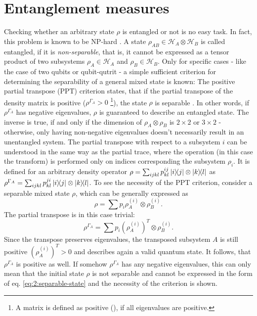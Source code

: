 \section{Entanglement measures}\label{sec:2:entanglement-measures}
Checking whether an arbitrary state $\rho$ is entangled or not is no easy task. In fact, this problem is known to be NP-hard \cite{Gurvits_2003}.
A state $\rho_{AB} \in \mathcal{H}_A\otimes\mathcal{H}_B$ is called entangled, if it is \emph{non-separable}, that is, it cannot be expressed as a tensor product of two subsystems $\rho_A \in \mathcal{H}_A$ and $\rho_B \in \mathcal{H}_B$.
Only for specific cases - like the case of two qubits or qubit-qutrit - a simple sufficient criterion for determining the separability of a general mixed state is known:
The positive partial transpose (PPT) criterion states, that if the partial transpose of the density matrix is positive ($\rho^{\Gamma_A} > 0$ \footnote{A matrix is defined as positive (), if all eigenvalues are positive.}), the state $\rho$ is separable \cite{Horodecki_2009,Plenio_2005a}.
In other words, if $\rho^{\Gamma_A}$ has negative eigenvalues, $\rho$ is guaranteed to describe an entangled state.
The inverse is true, if and only if the dimension of $\rho_A\otimes\rho_B$ is $2\times2$ or $3\times2$ \cite{Horodecki_2009} - otherwise, only having non-negative eigenvalues doesn't necessarily result in an unentangled system.
The partial transpose with respect to a subsystem $i$ can be understood in the same way as the partial trace, where the operation (in this case the transform) is performed only on indices corresponding the subsystem $\rho_i$.
It is defined for an arbitrary density operator $\rho = \sum_{ijkl}p^{ij}_{kl}\ketbra{i}{j}\otimes\ketbra{k}{l}$ as $\rho^{\Gamma_A} = \sum_{ijkl}p^{ji}_{kl}\ketbra{i}{j}\otimes\ketbra{k}{l}$.
To see the necessity of the PPT criterion, consider a separable mixed state $\rho$, which can be generally expressed as 
\begin{equation}\label{eq:2:separable-state}
  \rho = \sum p_i \rho_{A}^{(i)}\otimes\rho_{B}^{(i)} .
\end{equation}
The partial transpose is in this case trivial:
\begin{equation}
  \rho^{\Gamma_A} = \sum p_i (\rho_{A}^{(i)})^T \otimes \rho_{B}^{(i)} .
\end{equation}
Since the transpose preserves eigenvalues, the transposed subsystem $A$ is still positive $(\rho_{A}^{(i)})^T > 0$ and describes again a valid quantum state. It follows, that $\rho^{\Gamma_A}$ is positive as well.
If somehow $\rho^{\Gamma_A}$ has any negative eigenvalues, this can only mean that the initial state $\rho$ is not separable and cannot be expressed in the form of eq. \eqref{eq:2:separable-state} and the necessity of the criterion is shown.

